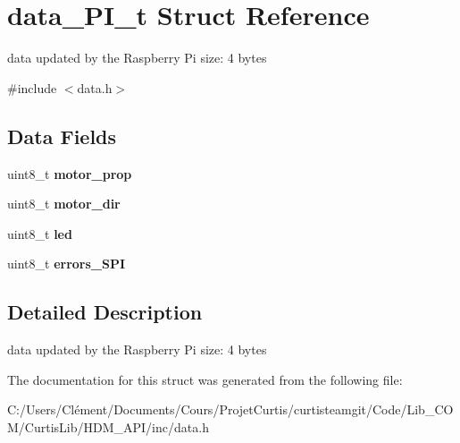 \hypertarget{structdata___p_i__t}{}\section{data\+\_\+\+P\+I\+\_\+t Struct Reference}
\label{structdata___p_i__t}


data updated by the Raspberry Pi size\+: 4 bytes  




{\ttfamily \#include $<$data.\+h$>$}

\subsection*{Data Fields}
\begin{DoxyCompactItemize}
\item 
\hypertarget{structdata___p_i__t_a6f934c30b868c2e4c5be658e9ad6038e}{}\label{structdata___p_i__t_a6f934c30b868c2e4c5be658e9ad6038e} 
uint8\+\_\+t {\bfseries motor\+\_\+prop}
\item 
\hypertarget{structdata___p_i__t_a5936671e7162e117f3126a707f376283}{}\label{structdata___p_i__t_a5936671e7162e117f3126a707f376283} 
uint8\+\_\+t {\bfseries motor\+\_\+dir}
\item 
\hypertarget{structdata___p_i__t_ac77dbc8ab27ec005a489d7b6e44ffaba}{}\label{structdata___p_i__t_ac77dbc8ab27ec005a489d7b6e44ffaba} 
uint8\+\_\+t {\bfseries led}
\item 
\hypertarget{structdata___p_i__t_a56fc6c2b4203fbb1de7443a668021479}{}\label{structdata___p_i__t_a56fc6c2b4203fbb1de7443a668021479} 
uint8\+\_\+t {\bfseries errors\+\_\+\+S\+PI}
\end{DoxyCompactItemize}


\subsection{Detailed Description}
data updated by the Raspberry Pi size\+: 4 bytes 

The documentation for this struct was generated from the following file\+:\begin{DoxyCompactItemize}
\item 
C\+:/\+Users/\+Clément/\+Documents/\+Cours/\+Projet\+Curtis/curtisteamgit/\+Code/\+Lib\+\_\+\+C\+O\+M/\+Curtis\+Lib/\+H\+D\+M\+\_\+\+A\+P\+I/inc/data.\+h\end{DoxyCompactItemize}
